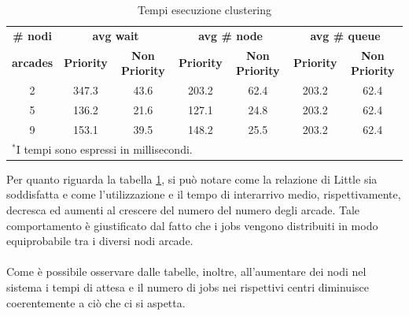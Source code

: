 \documentclass{article}
\begin{document}
\begin{table}[H]
\caption{Tempi esecuzione clustering}
\begin{center}
\begin{tabular}{|c|c|c|c|c|c|c|}
\hline
\textbf{\# nodi} & \multicolumn{2}{|c|}{\textbf{avg wait}} & \multicolumn{2}{|c|}{\textbf{avg \# node}} & \multicolumn{2}{|c|}{\textbf{avg \# queue}} \\ \cline{2-7} 
\textbf{arcades} & \textbf{Priority} & \textbf{Non Priority} & \textbf{Priority} & \textbf{Non Priority} & \textbf{Priority} & \textbf{Non Priority}\\ \hline
2 & 347.3 & 43.6 & 203.2 & 62.4 & 203.2 & 62.4\\ \hline
5 & 136.2 & 21.6 & 127.1 & 24.8 & 203.2 & 62.4\\ \hline
9 & 153.1 & 39.5 & 148.2 & 25.5 & 203.2 & 62.4\\ \hline
\multicolumn{7}{l}{$^{\mathrm{*}}$I tempi sono espressi in millisecondi.}
\end{tabular}
\label{tab2}
\end{center}
\end{table}


Per quanto riguarda la tabella \ref{tab2}, si può notare come la relazione di Little sia soddisfatta e come l'utilizzazione e il tempo di interarrivo medio, rispettivamente, decresca ed aumenti al crescere del numero del numero degli arcade. Tale comportamento è giustificato dal fatto che i jobs vengono distribuiti in modo equiprobabile tra i diversi nodi arcade.
\\ \\
Come è possibile osservare dalle tabelle, inoltre, all'aumentare dei nodi nel sistema i tempi di attesa e il numero di jobs nei rispettivi centri diminuisce coerentemente a ciò che ci si aspetta.
\end{document}
